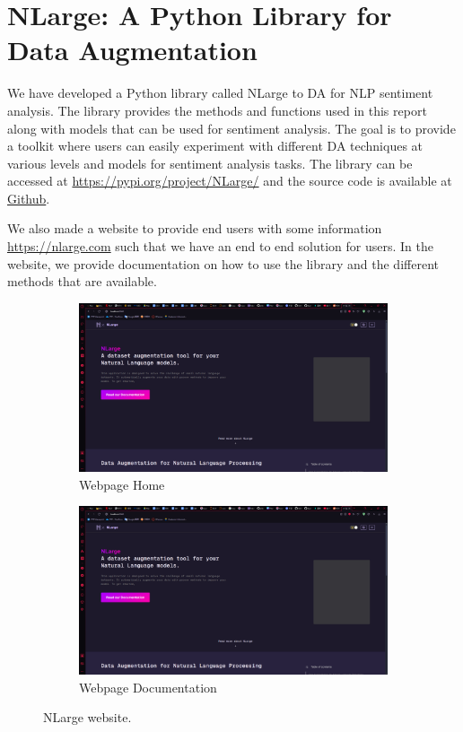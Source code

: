 \documentclass[10pt]{extarticle}
\begin{document}
\section{NLarge: A Python Library for Data Augmentation}

We have developed a Python library called NLarge to DA for NLP sentiment
analysis. The library provides the methods and functions used in this report
along with models that can be used for sentiment analysis. The goal is to
provide a toolkit where users can easily experiment with different DA
techniques at various levels and models for sentiment analysis tasks. The
library can be accessed at \url{https://pypi.org/project/NLarge/} and the
source code is available at
\href{https://github.com/HiIAmTzeKean/SC4001-NLarge}{Github}.

We also made a website to provide end users with some information
\url{https://nlarge.com} such that we have an end to end solution for users. In
the website, we provide documentation on how to use the library and the
different methods that are available.

\begin{figure}[ht]
  \centering
  \begin{subfigure}[b]{0.45\textwidth}
    \includegraphics[width=\textwidth]{img/nlarge_web_1.png}
    \caption{Webpage Home}
    \label{fig:nlarge_web_1}
  \end{subfigure}
  \hfill
  \begin{subfigure}[b]{0.45\textwidth}
    \includegraphics[width=\textwidth]{img/nlarge_web_1.png}
    \caption{Webpage Documentation}
    \label{fig:nlarge_web_2}
  \end{subfigure}
  \caption{NLarge website.}
  \label{fig:nlarge_web}
\end{figure}
\end{document}
